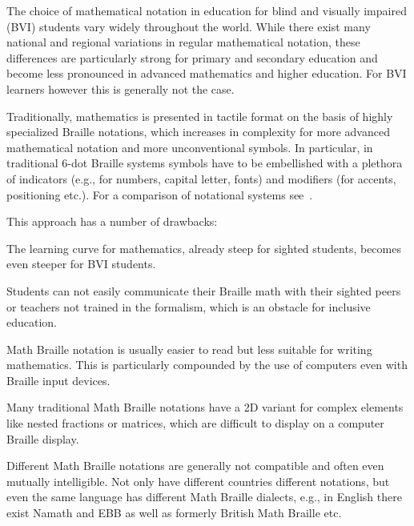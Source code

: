 \documentclass{easychair}
\begin{document}
The choice of mathematical notation in education for blind and visually impaired
(BVI) students vary widely throughout the world. While there exist many national
and regional variations in regular mathematical notation, these differences are
particularly strong for primary and secondary education and become less
pronounced in advanced mathematics and higher education. For BVI learners
however this is generally not the case.

Traditionally, mathematics is presented in tactile format on the basis of highly
specialized Braille notations, which increases in complexity for more advanced
mathematical notation and more unconventional symbols. In particular, in
traditional 6-dot Braille systems symbols have to be embellished with a plethora
of indicators (e.g., for numbers, capital letter, fonts) and modifiers (for
accents, positioning etc.). For a comparison of notational systems
see~\cite{van2022towards}.

This approach has a number of drawbacks: 
\begin{inparaenum}[(1)]
\item The learning curve for mathematics, already steep for sighted students,
  becomes even steeper for BVI students.
\item Students can not easily communicate their Braille math with their sighted
  peers or teachers not trained in the formalism, which is an obstacle for
  inclusive education.
\item Math Braille notation is usually easier to read but less suitable for
  writing mathematics. This is particularly compounded by the use of computers
  even with Braille input devices.
\item Many traditional Math Braille notations have a 2D variant for complex
  elements like nested fractions or matrices, which are difficult to display on
  a computer Braille display.
\item Different Math Braille notations are generally not compatible and often
  even mutually intelligible. Not only have different countries different
  notations, but even the same language has different Math Braille dialects,
  e.g., in English there exist Namath and EBB as well as formerly British Math
  Braille etc.
\end{inparaenum}
\end{document}
